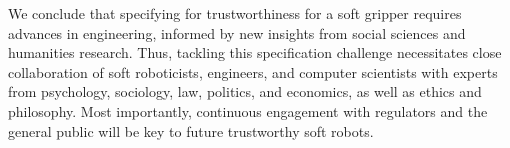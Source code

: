 \documentclass[lettersize,journal]{IEEEtran}
\begin{document}
%
%


We conclude that specifying for trustworthiness for a soft gripper requires advances in engineering, informed by new insights from social sciences and humanities research. Thus, tackling this specification challenge necessitates close collaboration of soft roboticists, engineers, and computer scientists with experts from psychology, sociology, law, politics, and economics, as well as ethics and philosophy. Most importantly, continuous engagement with regulators and the general public will be key to future trustworthy soft robots.
\end{document}
